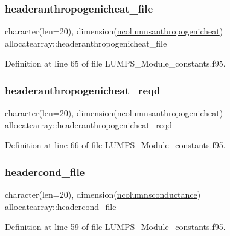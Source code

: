 \subsubsection{\texorpdfstring{headeranthropogenicheat\+\_\+file}{headeranthropogenicheat\_file}}
{\footnotesize\ttfamily character(len=20), dimension(\hyperlink{namespaceallocatearray_aa1105086801cd6c5c6be1d9563c93341}{ncolumnsanthropogenicheat}) allocatearray\+::headeranthropogenicheat\+\_\+file}



Definition at line 65 of file L\+U\+M\+P\+S\+\_\+\+Module\+\_\+constants.\+f95.

\mbox{\label{namespaceallocatearray_aa4b6448bbb7e330b4d44bedbc6ca04fd}} 
\subsubsection{\texorpdfstring{headeranthropogenicheat\+\_\+reqd}{headeranthropogenicheat\_reqd}}
{\footnotesize\ttfamily character(len=20), dimension(\hyperlink{namespaceallocatearray_aa1105086801cd6c5c6be1d9563c93341}{ncolumnsanthropogenicheat}) allocatearray\+::headeranthropogenicheat\+\_\+reqd}



Definition at line 66 of file L\+U\+M\+P\+S\+\_\+\+Module\+\_\+constants.\+f95.

\mbox{\label{namespaceallocatearray_adabcfce2cc166c20164de6589b4402f1}} 
\subsubsection{\texorpdfstring{headercond\+\_\+file}{headercond\_file}}
{\footnotesize\ttfamily character(len=20), dimension(\hyperlink{namespaceallocatearray_a2830c674e41c46900c1088c40baef680}{ncolumnsconductance}) allocatearray\+::headercond\+\_\+file}



Definition at line 59 of file L\+U\+M\+P\+S\+\_\+\+Module\+\_\+constants.\+f95.

